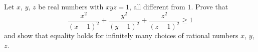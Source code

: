 Let $x$, $y$, $z$ be real numbers with $xyz = 1$,
all different from $1$.
Prove that
\[ \frac{x^2}{(x-1)^2} + \frac{y^2}{(y-1)^2}
+ \frac{z^2}{(z-1)^2} \ge 1 \]
and show that equality holds for infinitely many choices
of rational numbers $x$, $y$, $z$.
